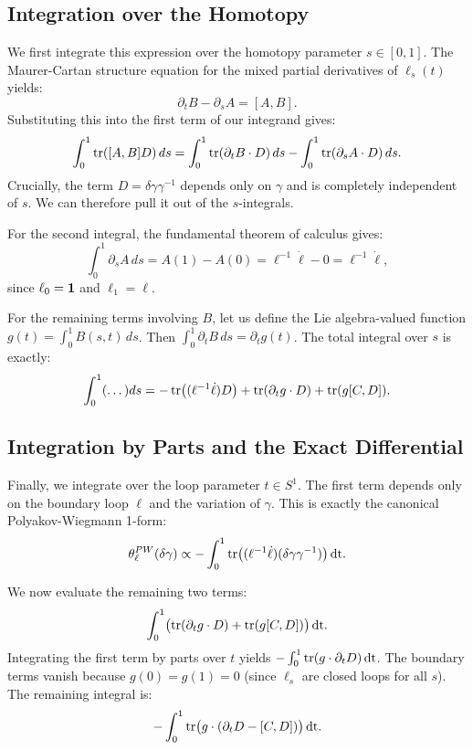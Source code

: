 \documentclass[11pt,reqno,letterpaper,twoside]{amsart}
\begin{document}
  \subsection{Integration over the Homotopy}
  
  We first integrate this expression over the homotopy parameter $s \in [0,1]$.
  The Maurer-Cartan structure equation for the mixed partial derivatives of $\ell_s(t)$ yields:
  \[
    \partial_t B - \partial_s A = [A, B].
    \]
  Substituting this into the first term of our integrand gives:
  \[
    \int_0^1 \operatorname{tr}([A, B]D) \, ds = \int_0^1 \operatorname{tr}(\partial_t B \cdot D) \, ds - \int_0^1 \operatorname{tr}(\partial_s A \cdot D) \, ds.
    \]
  Crucially,
  the term $D = \delta\gamma \gamma^{-1}$ depends only on $\gamma$ and is completely independent of $s$.
  We can therefore pull it out of the $s$-integrals.
  
  For the second integral,
  the fundamental theorem of calculus gives:
  \[
    \int_0^1 \partial_s A \, ds = A(1) - A(0) = \ell^{-1}\dot{\ell} - 0 = \ell^{-1}\dot{\ell},
    \]
  since $\ell_0 = \boldsymbol{1}$ and $\ell_1 = \ell$.
  
  For the remaining terms involving $B$,
  let us define the Lie algebra-valued function $g(t) = \int_0^1 B(s, t) \, ds$.
  Then $\int_0^1 \partial_t B \, ds = \partial_t g(t)$.
  The total integral over $s$ is exactly:
  \[
    \int_0^1 (\dots) ds = - \operatorname{tr}\bigl( (\ell^{-1}\dot{\ell}) D \bigr) + \operatorname{tr}(\partial_t g \cdot D) + \operatorname{tr}(g[C, D]).
    \]
  
  \subsection{Integration by Parts and the Exact Differential}
  
  Finally,
  we integrate over the loop parameter $t \in S^1$.
  The first term depends only on the boundary loop $\ell$ and the variation of $\gamma$.
  This is exactly the canonical Polyakov-Wiegmann 1-form:
  \[
    \theta^{PW}_\ell(\delta\gamma) \propto - \int_0^1 \operatorname{tr}\bigl( (\ell^{-1}\dot{\ell}) (\delta\gamma \gamma^{-1}) \bigr) \, \mathrm{dt}.
    \]
  
  We now evaluate the remaining two terms:
  \[
    \int_0^1 \bigl( \operatorname{tr}(\partial_t g \cdot D) + \operatorname{tr}(g[C, D]) \bigr) \, \mathrm{dt}.
    \]
  Integrating the first term by parts over $t$ yields $-\int_0^1 \operatorname{tr}(g \cdot \partial_t D) \, \mathrm{dt}$.
  The boundary terms vanish because $g(0) = g(1) = 0$ (since $\ell_s$ are closed loops for all $s$).
  The remaining integral is:
  \[
    - \int_0^1 \operatorname{tr}\bigl( g \cdot (\partial_t D - [C, D]) \bigr) \, \mathrm{dt}.
    \]
  
\end{document}
